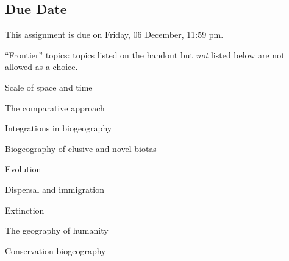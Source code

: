 \documentclass[12pt]{article}
\begin{document}
\subsection*{Due Date}

This assignment is due on Friday, 06 December, 11:59 pm.

\newpage

``Frontier'' topics: topics listed on the handout but \emph{not} listed below are not allowed as a choice.

\bigskip

Scale of space and time

\bigskip

The comparative approach

\bigskip

Integrations in biogeography

\bigskip

Biogeography of elusive and novel biotas

\bigskip

Evolution

\bigskip

Dispersal and immigration

\bigskip

Extinction

\bigskip

The geography of humanity

\bigskip

Conservation biogeography

\bigskip
\end{document}

